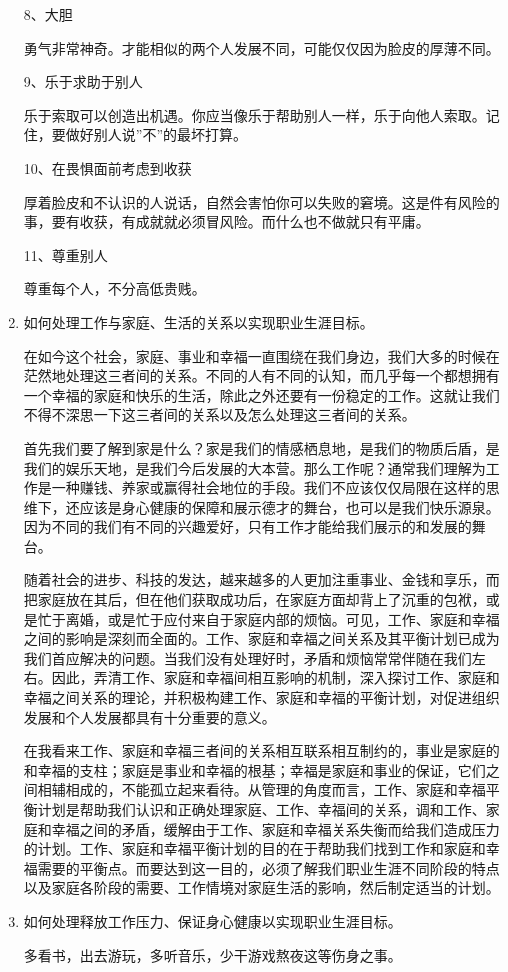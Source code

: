 \documentclass{article}
\begin{document}
\begin{enumerate}[1、]
	8、大胆\par
	勇气非常神奇。才能相似的两个人发展不同，可能仅仅因为脸皮的厚薄不同。\par
	9、乐于求助于别人\par
	乐于索取可以创造出机遇。你应当像乐于帮助别人一样，乐于向他人索取。记住，要做好别人说”不”的最坏打算。\par
	10、在畏惧面前考虑到收获\par
	厚着脸皮和不认识的人说话，自然会害怕你可以失败的窘境。这是件有风险的事，要有收获，有成就就必须冒风险。而什么也不做就只有平庸。	\par
	11、尊重别人	\par
	尊重每个人，不分高低贵贱。\par
	\item 如何处理工作与家庭、生活的关系以实现职业生涯目标。\par
    在如今这个社会，家庭、事业和幸福一直围绕在我们身边，我们大多的时候在茫然地处理这三者间的关系。不同的人有不同的认知，而几乎每一个都想拥有一个幸福的家庭和快乐的生活，除此之外还要有一份稳定的工作。这就让我们不得不深思一下这三者间的关系以及怎么处理这三者间的关系。\par
	首先我们要了解到家是什么？家是我们的情感栖息地，是我们的物质后盾，是我们的娱乐天地，是我们今后发展的大本营。那么工作呢？通常我们理解为工作是一种赚钱、养家或赢得社会地位的手段。我们不应该仅仅局限在这样的思维下，还应该是身心健康的保障和展示德才的舞台，也可以是我们快乐源泉。因为不同的我们有不同的兴趣爱好，只有工作才能给我们展示的和发展的舞台。\par
	随着社会的进步、科技的发达，越来越多的人更加注重事业、金钱和享乐，而把家庭放在其后，但在他们获取成功后，在家庭方面却背上了沉重的包袱，或是忙于离婚，或是忙于应付来自于家庭内部的烦恼。可见，工作、家庭和幸福之间的影响是深刻而全面的。工作、家庭和幸福之间关系及其平衡计划已成为我们首应解决的问题。当我们没有处理好时，矛盾和烦恼常常伴随在我们左右。因此，弄清工作、家庭和幸福间相互影响的机制，深入探讨工作、家庭和幸福之间关系的理论，并积极构建工作、家庭和幸福的平衡计划，对促进组织发展和个人发展都具有十分重要的意义。\par
	在我看来工作、家庭和幸福三者间的关系相互联系相互制约的，事业是家庭的和幸福的支柱；家庭是事业和幸福的根基；幸福是家庭和事业的保证，它们之间相辅相成的，不能孤立起来看待。从管理的角度而言，工作、家庭和幸福平衡计划是帮助我们认识和正确处理家庭、工作、幸福间的关系，调和工作、家庭和幸福之间的矛盾，缓解由于工作、家庭和幸福关系失衡而给我们造成压力的计划。工作、家庭和幸福平衡计划的目的在于帮助我们找到工作和家庭和幸福需要的平衡点。而要达到这一目的，必须了解我们职业生涯不同阶段的特点以及家庭各阶段的需要、工作情境对家庭生活的影响，然后制定适当的计划。\par
	\item 如何处理释放工作压力、保证身心健康以实现职业生涯目标。\par
	多看书，出去游玩，多听音乐，少干游戏熬夜这等伤身之事。\par
\end{enumerate}
\par 
\end{document}
